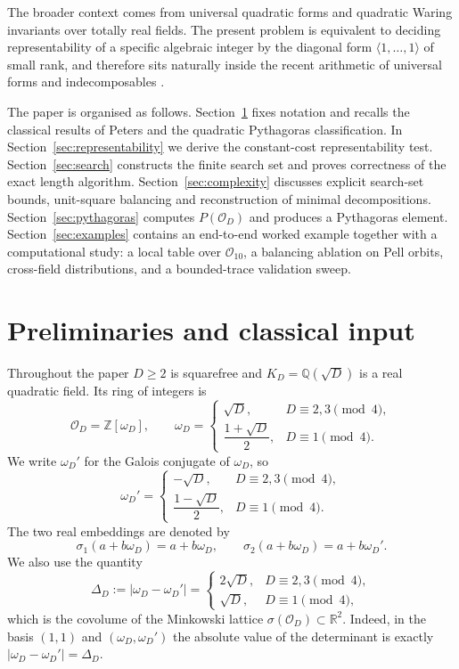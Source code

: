 \documentclass[manuscript,screen]{acmart}
\renewcommand{\ge}{\geqslant}
\theoremstyle{plain}
\theoremstyle{definition}
\theoremstyle{nonitalicremark}
\newcommand{\Q}{\mathbb{Q}}
\newcommand{\Z}{\mathbb{Z}}
\newcommand{\R}{\mathbb{R}}
\newcommand{\OD}{\mathcal{O}_D}
\newcommand{\OO}{\mathcal{O}}
\newcommand{\wD}{\omega_D}
\newcommand{\wDp}{\omega_D'}
\newcommand{\sig}{\sigma}
\begin{document}
The broader context comes from universal quadratic forms and quadratic Waring invariants over
totally real fields. The present problem is equivalent to deciding representability of a specific
algebraic integer by the diagonal form $\langle 1,\dots,1\rangle$ of small rank, and therefore sits
naturally inside the recent arithmetic of universal forms and indecomposables
\cite{KalaSurvey,KYWaring}.

The paper is organised as follows. Section~\ref{sec:prelim} fixes notation and recalls the
classical results of Peters and the quadratic Pythagoras classification. In
Section~\ref{sec:representability} we derive the constant-cost representability test.
Section~\ref{sec:search} constructs the finite search set and proves correctness of the exact
length algorithm. Section~\ref{sec:complexity} discusses explicit search-set bounds,
unit-square balancing and reconstruction of minimal decompositions. Section~\ref{sec:pythagoras}
computes $P(\OD)$ and produces a Pythagoras element. Section~\ref{sec:examples} contains an
end-to-end worked example together with a computational study: a local table over $\OO_{10}$, a balancing ablation on Pell orbits, cross-field distributions, and a bounded-trace validation sweep.

\section{Preliminaries and classical input}\label{sec:prelim}

Throughout the paper $D \ge 2$ is squarefree and
\(
K_D = \Q(\sqrt{D})
\)
is a real quadratic field. Its ring of integers is
\[
\OD = \Z[\wD], \qquad
\wD =
\begin{cases}
\sqrt{D}, & D \equiv 2,3 \pmod 4,\\[0.4em]
\dfrac{1+\sqrt{D}}{2}, & D \equiv 1 \pmod 4.
\end{cases}
\]
We write $\wDp$ for the Galois conjugate of $\wD$, so
\[
\wDp =
\begin{cases}
-\sqrt{D}, & D \equiv 2,3 \pmod 4,\\[0.4em]
\dfrac{1-\sqrt{D}}{2}, & D \equiv 1 \pmod 4.
\end{cases}
\]
The two real embeddings are denoted by
\[
\sig_1(a+b\wD)=a+b\wD, \qquad \sig_2(a+b\wD)=a+b\wDp.
\]
We also use the quantity
\[
\Delta_D := |\wD-\wDp| =
\begin{cases}
2\sqrt{D}, & D \equiv 2,3 \pmod 4,\\[0.2em]
\sqrt{D}, & D \equiv 1 \pmod 4,
\end{cases}
\]
which is the covolume of the Minkowski lattice $\sig(\OD) \subset \R^2$.
Indeed, in the basis $(1,1)$ and $(\wD,\wDp)$ the absolute value of the determinant is exactly
$|\wD-\wDp|=\Delta_D$.
\end{document}
